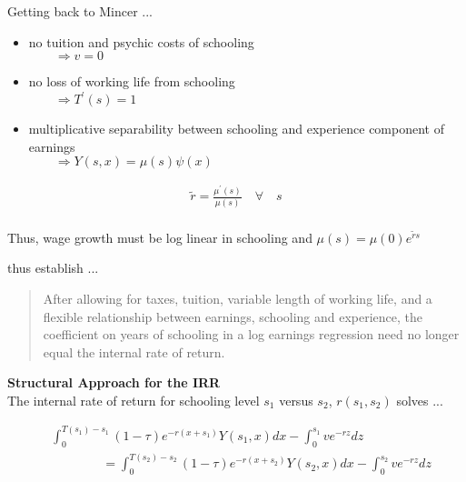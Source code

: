 \begin{frame}
Getting back to Mincer ...
\begin{itemize}
\item no tuition and psychic costs of schooling \\
    $\qquad\Rightarrow v = 0$
\item no loss of working life from schooling \\
    $\qquad\Rightarrow T^\prime(s) = 1$
\item multiplicative separability between schooling and experience component of earnings \\
    $\qquad\Rightarrow Y(s, x) = \mu(s)\psi(x)$
\end{itemize}
\end{frame}


\begin{frame}
\begin{align*}
\tilde{r} = \frac{\mu^\prime(s)}{\mu(s)}\quad\forall\quad s\\
\end{align*}

Thus, wage growth must be log linear in schooling and $\mu(s) = \mu(0)e^{\tilde{r}s}$
\end{frame}




\begin{frame}
\citet{Heckman.2006a} thus establish ... \vspace{0.5cm}

\begin{quote}
After allowing for taxes, tuition, variable length of working life, and a flexible relationship between earnings, schooling and experience, the coefficient on years of schooling in a log earnings regression need no longer equal the internal rate of return.
\end{quote}
\end{frame}


\begin{frame}\textbf{Structural Approach for the IRR}\vspace{0.3cm}\\

The internal rate of return for schooling level $s_1$ versus $s_2$, $r(s_1, s_2)$ solves ...

\begin{align*}
&\int_{0}^{T(s_1) - s_1} (1 - \tau)e^{-r(x + s_1)}Y(s_1, x) dx  - \int_{0}^{s_1} v e^{-r z} dz\\
&\qquad\qquad =  \int_{0}^{T(s_2) - s_2} (1 - \tau)e^{-r(x + s_2)}Y(s_2, x) dx - \int_{0}^{s_2} v e^{-r z} dz
\end{align*}

\end{frame}

